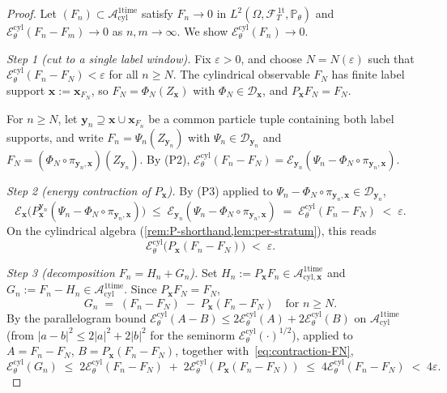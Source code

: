 \documentclass[11pt,reqno]{amsart}
\theoremstyle{plain}
\theoremstyle{definition}
\theoremstyle{remark}
\newcommand{\Prob}{\mathbb P}
\newcommand{\cA}{\mathcal A}
\newcommand{\cE}{\mathcal E}
\newcommand{\cF}{\mathcal F}
\newcommand{\Aone}{\cA_{\mathrm{cyl}}^{\mathrm{1time}}}
\newcommand{\Aoneat}[1]{\cA^{\mathrm{1time}}_{\mathrm{cyl},#1}}
\newcommand{\FT}{\cF_{T}^{\,\mathrm{1t}}}
\newcommand{\Hone}{L^{2}(\Omega,\FT,\Pth)}
\newcommand{\Ecyl}{\cE_{\theta}^{\mathrm{cyl}}}
\newcommand{\Pth}{\Prob_{\theta}}
\begin{document}
\begin{proof}
Let $(F_{n})\subset\Aone$ satisfy $F_{n}\to 0$ in $\Hone$ and
$\Ecyl(F_{n}-F_{m})\to 0$ as $n,m\to\infty$. We show $\Ecyl(F_{n})\to 0$.

\emph{Step 1 (cut to a single label window).} Fix $\varepsilon>0$,
and choose $N=N(\varepsilon)$ such that
$\Ecyl(F_{n}-F_{N})<\varepsilon$ for all $n\ge N$. The cylindrical
observable $F_{N}$ has finite label support $\mathbf x:=\mathbf x_{F_{N}}$,
so $F_{N}=\Phi_{N}(Z_{\mathbf x})$ with $\Phi_{N}\in\mathcal D_{\mathbf x}$,
and $P_{\mathbf x}F_{N}=F_{N}$.

For $n\ge N$, let $\mathbf y_{n}\supseteq\mathbf x\cup\mathbf x_{F_{n}}$
be a common particle tuple containing both label supports, and
write $F_{n}=\Psi_{n}(Z_{\mathbf y_{n}})$ with
$\Psi_{n}\in\mathcal D_{\mathbf y_{n}}$ and
$F_{N}=(\Phi_{N}\circ\pi_{\mathbf y_{n},\mathbf x})(Z_{\mathbf y_{n}})$.
By (P2),
$\Ecyl(F_{n}-F_{N})=\cE_{\mathbf y_{n}}(\Psi_{n}-\Phi_{N}\circ\pi_{\mathbf y_{n},\mathbf x})$.

\emph{Step 2 (energy contraction of $P_{\mathbf x}$).} By (P3)
applied to $\Psi_{n}-\Phi_{N}\circ\pi_{\mathbf y_{n},\mathbf x}\in\mathcal D_{\mathbf y_{n}}$,
\[
  \cE_{\mathbf x}\bigl(P_{\mathbf x}^{\mathbf y_{n}}(\Psi_{n}-\Phi_{N}\circ\pi_{\mathbf y_{n},\mathbf x})\bigr)
  \;\le\;\cE_{\mathbf y_{n}}(\Psi_{n}-\Phi_{N}\circ\pi_{\mathbf y_{n},\mathbf x})
  \;=\;\Ecyl(F_{n}-F_{N})\;<\;\varepsilon.
\]
On the cylindrical algebra (\cref{rem:P-shorthand,lem:per-stratum}),
this reads
\begin{equation}\label{eq:contraction-FN}
  \Ecyl\bigl(P_{\mathbf x}(F_{n}-F_{N})\bigr)\;<\;\varepsilon.
\end{equation}

\emph{Step 3 (decomposition $F_{n}=H_{n}+G_{n}$).} Set
$H_{n}:=P_{\mathbf x}F_{n}\in\Aoneat{\mathbf x}$ and
$G_{n}:=F_{n}-H_{n}\in\Aone$. Since $P_{\mathbf x}F_{N}=F_{N}$,
\[
  G_{n}\;=\;(F_{n}-F_{N})\;-\;P_{\mathbf x}(F_{n}-F_{N})
  \quad\text{for }n\ge N.
\]
By the parallelogram bound
$\Ecyl(A-B)\le 2\Ecyl(A)+2\Ecyl(B)$ on $\Aone$ (from
$|a-b|^{2}\le 2|a|^{2}+2|b|^{2}$ for the seminorm
$\Ecyl(\cdot)^{1/2}$), applied to $A=F_{n}-F_{N}$,
$B=P_{\mathbf x}(F_{n}-F_{N})$, together with~\eqref{eq:contraction-FN},
\begin{equation}\label{eq:G-bound}
  \Ecyl(G_{n})
  \;\le\;2\Ecyl(F_{n}-F_{N})\;+\;2\Ecyl(P_{\mathbf x}(F_{n}-F_{N}))
  \;\le\;4\Ecyl(F_{n}-F_{N})\;<\;4\varepsilon.
\end{equation}


\end{proof}
\end{document}
